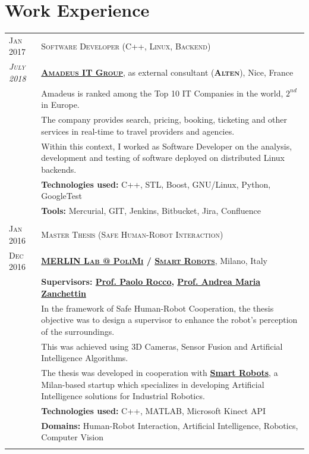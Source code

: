 \documentclass[a4paper,10pt]{article}
\begin{document}
	\vspace{-5mm}

	\section{Work Experience}
	\begin{tabular}{p{2cm}|p{13.8cm}}
		\centering\textsc{Jan 2017} &
		\textsc{Software Developer (C++, Linux, Backend)} \\
		\centering\emph{\textsc{July 2018}} &
		\textsc{\textbf{\href{http://www.amadeus.com/}{Amadeus IT Group}}}, as external consultant (\textsc{\textbf{Alten}}), \hfill Nice, France\\
		& Amadeus is ranked among the Top 10 IT Companies in the world, $2^{nd}$ in Europe.\\
		& The company provides search, pricing, booking, ticketing and other services in real-time to travel providers and agencies.\\
		& Within this context, I worked as Software Developer on the analysis, development and testing of software deployed on distributed Linux backends.\\
		& \textbf{Technologies used:} C++, STL, Boost, GNU/Linux, Python, GoogleTest\\
		& \textbf{Tools:} Mercurial, GIT, Jenkins, Bitbucket, Jira, Confluence\\

		\multicolumn{2}{c}{} \\
		\centering\textsc{Jan 2016 } & 
		\textsc{Master Thesis (Safe Human-Robot Interaction)} \\
		\centering\textsc{Dec 2016} &
		\textsc{\textbf{\href{http://merlin.dei.polimi.it/}{MERLIN Lab @ PoliMi} / \href{http://smartrobots.it/en/}{Smart Robots}}}, \hfill Milano, Italy\\
		& \textbf{Supervisors: \href{http://home.deib.polimi.it/rocco/}{Prof. Paolo Rocco}, \href{https://home.deib.polimi.it/zanchettin/index.html}{Prof. Andrea Maria Zanchettin}}\\
		& In the framework of Safe Human-Robot Cooperation, the thesis objective was to design a supervisor to enhance the robot's perception of the surroundings.\\
		& This was achieved using 3D Cameras, Sensor Fusion and Artificial Intelligence Algorithms.\\
		& The thesis was developed in cooperation with \textbf{\href{http://smartrobots.it/en/}{Smart Robots}}, a Milan-based startup which specializes in developing Artificial Intelligence solutions for Industrial Robotics.\\
		& \textbf{Technologies used:}  C++, MATLAB, Microsoft Kinect API\\
		& \textbf{Domains:} Human-Robot Interaction, Artificial Intelligence, Robotics, Computer Vision\\
		\multicolumn{2}{c}{} \\
	\end{tabular}
\end{document}
